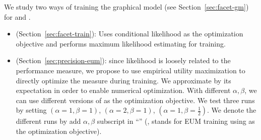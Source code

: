 We study two ways of training the graphical model (see Section~\ref{sec:facet-gm}) for \QFI and \QFJ.
\begin{itemize}
\item \MLE (Section~\ref{sec:facet-train}): Uses conditional likelihood as the optimization objective and performs maximum likelihood estimating for training.
\item \EUM (Section~\ref{sec:precision-eum}): since likelihood is loosely related to the performance measure, we propose to use empirical utility maximization to directly optimize the \PRF measure during training. We approximate \PRF by its expectation in order to enable numerical optimization. With different $\alpha,\beta$, we can use different versions of \PRF as the optimization objective. We test three runs by setting $(\alpha\!=\!1,\beta\!=\!1)$, $(\alpha\!=\!2,\beta\!=\!1)$, $(\alpha\!=\!1,\beta\!=\!\frac{1}{2})$. 
We denote the different runs by add $\alpha,\beta$ subscript in ``\EUM'' (\eg,  stands for EUM training using  as the optimization objective).
\end{itemize}
